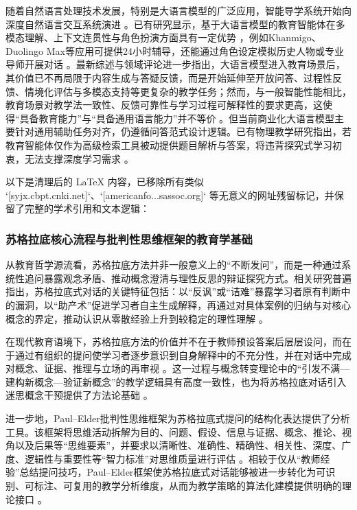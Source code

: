 随着自然语言处理技术发展，特别是大语言模型的广泛应用，智能导学系统开始向深度自然语言交互系统演进 \citep{ref10}。已有研究显示，基于大语言模型的教育智能体在多模态理解、上下文连贯性与角色扮演方面具有一定优势 \citep{ref24}，例如Khanmigo、Duolingo Max等应用可提供24小时辅导，还能通过角色设定模拟历史人物或专业导师开展对话 \citep{ref10}。最新综述与领域评论进一步指出，大语言模型进入教育场景后，其价值已不再局限于内容生成与答疑反馈，而是开始延伸至开放问答、过程性反馈、情境化评估与多模态支持等更复杂的教学任务；然而，与一般智能性能相比，教育场景对教学法一致性、反馈可靠性与学习过程可解释性的要求更高，这使得“具备教育能力”与“具备通用语言能力”并不等价 \citep{xing2025llmeducation,seo2025llmevaluators}。但当前商业化大语言模型主要针对通用辅助任务对齐，仍遵循问答范式设计逻辑。已有物理教学研究指出，若教育智能体仅作为高级检索工具被动提供题目解析与答案，将违背探究式学习初衷，无法支撑深度学习需求 \citep{ref16}。

以下是清理后的 LaTeX 内容，已移除所有类似 `[syjx.cbpt.cnki.net]`、`[americanfo...sassoc.org]` 等无意义的网址残留标记，并保留了完整的学术引用和文本逻辑：


\subsubsection{苏格拉底核心流程与批判性思维框架的教育学基础}
从教育哲学源流看，苏格拉底方法并非一般意义上的“不断发问”，而是一种通过系统性追问暴露观念矛盾、推动概念澄清与理性反思的辩证探究方式。相关研究普遍指出，苏格拉底式对话的关键特征包括：以“反讽”或“诘难”暴露学习者原有判断中的漏洞，以“助产术”促进学习者自主生成解释，再通过对具体案例的归纳与对核心概念的界定，推动认识从零散经验上升到较稳定的理性理解 \citep{gogus2018socraticquestioning,kraut2026socraticmethod}。

在现代教育语境下，苏格拉底方法的价值并不在于教师预设答案后层层设问，而在于通过有组织的提问使学习者逐步意识到自身解释中的不充分性，并在对话中完成对概念、证据、推理与立场的再审视 \citep{gogus2018socraticquestioning,paul2007socratic}。这一过程与概念转变理论中的“引发不满—建构新概念—验证新概念”的教学逻辑具有高度一致性，也为将苏格拉底对话引入迷思概念干预提供了方法论基础 \citep{ref9,ref36}。

进一步地，Paul--Elder批判性思维框架为苏格拉底式提问的结构化表达提供了分析工具。该框架将思维活动拆解为目的、问题、假设、信息与证据、概念、推论、视角以及后果等“思维要素”，并要求以清晰性、准确性、精确性、相关性、深度、广度、逻辑性与重要性等“智力标准”对思维质量进行评估 \citep{paul2007socratic,paul2010criticalthinking}。相较于仅从“教师经验”总结提问技巧，Paul--Elder框架使苏格拉底式对话能够被进一步转化为可识别、可标注、可复用的教学分析维度，从而为教学策略的算法化建模提供明确的理论接口 \citep{paul2007socratic,paul2010criticalthinking}。

